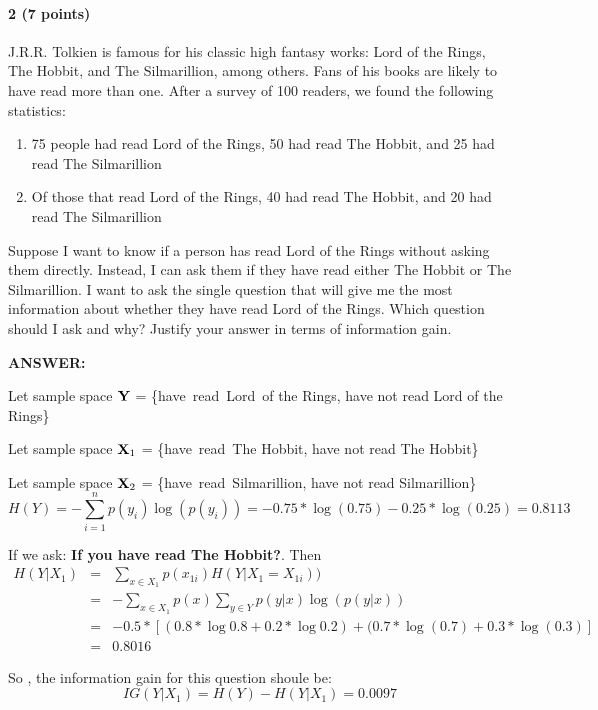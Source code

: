 \documentclass[11pt]{article}
\newcommand{\X}{{\bf X}}
\newcommand{\Y}{{\bf Y}}
\begin{document}
\paragraph{2 (7 points)} J.R.R. Tolkien is famous for his classic high fantasy works: Lord of the Rings, The Hobbit, and The Silmarillion, among others. Fans of his books
are likely to have read more than one. After a survey of 100 readers, we found the following statistics:
\begin{enumerate}
\item 75 people had read Lord of the Rings, 50 had read The Hobbit, and 25 had read The Silmarillion
\item Of those that read Lord of the Rings, 40 had read The Hobbit, and 20 had read The Silmarillion
\end{enumerate}
Suppose I want to know if a person has read Lord of the Rings without asking them directly. Instead, I can ask them if they have read either The Hobbit or The Silmarillion. I want to ask the single question that will give me the most information about whether they have read Lord of the Rings. Which question should I ask and why? Justify your answer in terms of information gain.
\par \textbf{ANSWER:}
\par Let sample space $\Y$ = \{have\ read\ Lord\ of the Rings, have not read Lord of the Rings\}
\par Let sample space $\X_1$ = \{have\ read\ The Hobbit, have not read The Hobbit\}
\par Let sample space $\X_2$ = \{have\ read\ Silmarillion, have not read Silmarillion\}
\begin{equation}
H(Y) = -\sum_{i = 1}^{n}p(y_i)\log(p(y_i)) = - 0.75* \log(0.75) - 0.25 * \log(0.25) =  0.8113
\end{equation}
\par If we ask: \textbf{If you have read The Hobbit?}. Then
\begin{eqnarray}
H(Y|X_1) &=& \sum_{x \in X_1}p(x_{1i})H(Y|X_1 = X_{1i})) \\
&=& -\sum_{x \in X_1}p(x) \sum_{y \in Y}p(y| x) \log(p(y|x))\\
&=&  - 0.5 * [(0.8 * \log0.8 + 0.2 * \log0.2) 
 + (0.7 * \log(0.7) + 0.3*\log(0.3)] \\
&=& 0.8016
\end{eqnarray}
\par So , the information gain for this question shoule be:
\begin{equation}
IG(Y|X_1) = H(Y) - H(Y|X_1) = 0.0097
\end{equation}
\end{document}
